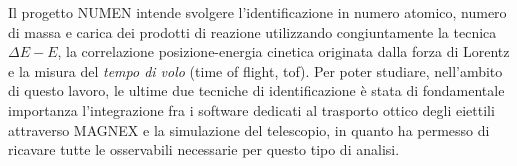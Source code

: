 Il progetto NUMEN intende svolgere l'identificazione in numero atomico, numero di massa e carica dei prodotti di reazione utilizzando congiuntamente la tecnica $\Delta E - E$, la correlazione posizione-energia cinetica originata dalla forza di Lorentz e la misura del \emph{tempo di volo} (time of flight, tof).
Per poter studiare, nell'ambito di questo lavoro, le ultime due tecniche di identificazione è stata di fondamentale importanza l'integrazione fra i software dedicati al trasporto ottico degli eiettili attraverso MAGNEX e la simulazione \geant{} del telescopio, in quanto ha permesso di ricavare tutte le osservabili necessarie per questo tipo di analisi. 

